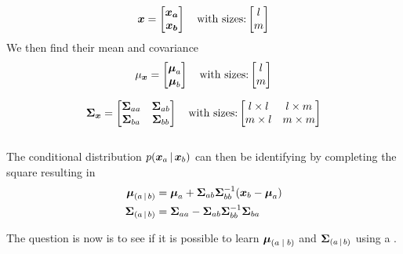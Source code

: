 \begin{equation}
\boldsymbol{\boldsymbol{x}} = 
\begin{bmatrix}
\boldsymbol{\boldsymbol{x}_a} \\
\boldsymbol{\boldsymbol{x}_b}
\end{bmatrix}
\quad
\text{with sizes:} 
\begin{bmatrix}
l \\
m
\end{bmatrix}
\end{equation}
We then find their mean and covariance
\begin{equation}
\mu_{\boldsymbol{x}} = 
\begin{bmatrix}
\boldsymbol{\mu}_{a} \\
\boldsymbol{\mu}_{b}
\end{bmatrix}
\quad
\text{with sizes:} 
\begin{bmatrix}
l \\
m
\end{bmatrix}
\end{equation}

\begin{equation}
\boldsymbol{\Sigma}_{\boldsymbol{x}} = 
\begin{bmatrix}
\boldsymbol{\Sigma}_{aa} & \boldsymbol{\Sigma}_{ab} \\
\boldsymbol{\Sigma}_{ba} & \boldsymbol{\Sigma}_{bb}
\end{bmatrix}
\quad
\text{with sizes:} 
\begin{bmatrix}
l\times l & l \times m\\
m \times l & m \times m
\end{bmatrix}
\end{equation}
\\
The conditional distribution $p\given{\vx_a}{\vx_b}$ can then be identifying by completing the square resulting in
\begin{align}
\vec{\mu}_{\given{a}{b}} &= \vec{\mu}_{a} + \vec{\Sigma}_{ab}\vec{\Sigma}_{bb}^{-1}(\vec{x}_b - \vec{\mu}_{a})
\label{eq_cond_mean}
\\
\vec{\Sigma}_{\given{a}{b}} &= \vec{\Sigma}_{aa} - \vec{\Sigma}_{ab}\vec{\Sigma}_{bb}^{-1}\vec{\Sigma}_{ba}
\label{eq_cond_var}
\end{align}

The question is now is to see if it is possible to learn $\vec{\mu}_{\given*{a}{b}}$ and $\vec{\Sigma}_{\given{a}{b}}$ using a \cvae{}.


